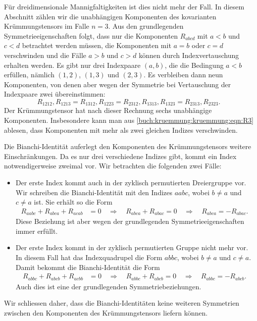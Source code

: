Für dreidimensionale Mannigfaltigkeiten ist dies nicht mehr der Fall.
In diesem Abschnitt zählen wir die unabhängigen Komponenten des
kovarianten Krümmungstensors im Falle $n=3$.
Aus den grundlegenden Symmetrieeigenschaften folgt, dass nur die
Komponenten $R_{abcd}$ mit $a<b$ und $c<d$ betrachtet werden müssen,
die Komponenten mit $a=b$ oder $c=d$ verschwinden und die Fälle
$a>b$ und $c>d$ können durch Indexvertauschung erhalten werden.
Es gibt nur drei Indexpaare $(a,b)$, die die Bedingung $a<b$
erfüllen, nämlich $(1,2)$, $(1,3)$ und $(2,3)$.
Es verbleiben dann neun Komponenten, von denen aber wegen der
Symmetrie bei Vertauschung der Indexpaare zwei übereinstimmen:
\begin{equation}
R_{1212},
R_{1213} = R_{1312},
R_{1223} = R_{2312},
R_{1313},
R_{1323} = R_{2313},
R_{2323}.
\label{buch:kruemmung:kruemmung:eqn:R3}
\end{equation}
Der Krümmungstensor hat nach dieser Rechnung sechs unabhängige Komponenten.
Insbesondere kann man aus \eqref{buch:kruemmung:kruemmung:eqn:R3} ablesen,
dass Komponenten mit mehr als zwei gleichen Indizes verschwinden.

Die Bianchi-Identität auferlegt den Komponenten des Krümmungstensors
weitere Einschränkungen.
Da es nur drei verschiedene Indizes gibt, kommt ein Index notwendigerweise
zweimal vor.
Wir betrachten die folgenden zwei Fälle:
\begin{itemize}
\item
Der erste Index kommt auch in der zyklisch permutierten
Dreiergruppe vor.
Wir schreiben die Bianchi-Identität mit den Indizes $aabc$,
wobei $b\ne a$ und $c\ne a$ ist.
Sie erhält so die Form
\begin{align*}
R_{aabc}
+
R_{abca}
+
R_{acab}
&=
0
\quad
\Rightarrow
\quad
R_{abca}
+
R_{abac}
=
0
\quad\Rightarrow\quad
R_{abca} = -R_{abac}.
\end{align*}
Diese Beziehung ist aber wegen der grundlegenden Symmetrieeigenschaften
immer erfüllt.
\item
Der erste Index kommt in der zyklisch permutierten Gruppe nicht mehr vor.
In diesem Fall hat das Indexquadrupel die Form $abbc$, wobei $b\ne a$ und
$c\ne a$.
Damit bekommt die Bianchi-Identität die Form
\begin{align*}
R_{abbc}
+
R_{abcb}
+
R_{acbb}
&=
0
\quad \Rightarrow\quad
R_{abbc}
+
R_{abcb}
=
0
\quad\Rightarrow\quad
R_{abbc} = -R_{abcb}.
\end{align*}
Auch dies ist eine der grundlegenden Symmetriebeziehungen.
\end{itemize}
Wir schliessen daher, dass die Bianchi-Identitäten keine weiteren
Symmetrien zwischen den Komponenten des Krümmungstensors liefern
können.

